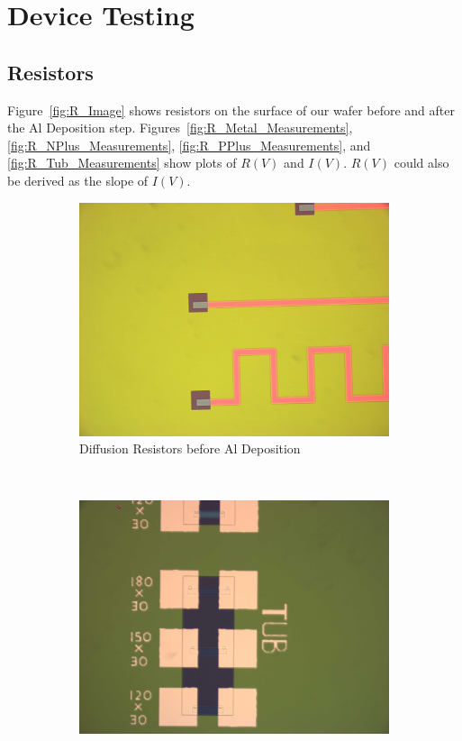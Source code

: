 \documentclass[letter,12pt]{article}
\begin{document}
\clearpage
\FloatBarrier
\section{Device Testing}
	\subsection{Resistors}
		Figure~\ref{fig:R_Image} shows resistors on the surface of our wafer before and after the Al Deposition step.  Figures~\ref{fig:R_Metal_Measurements}, \ref{fig:R_NPlus_Measurements}, \ref{fig:R_PPlus_Measurements}, and \ref{fig:R_Tub_Measurements} show plots of $R(V)$ and $I(V)$. $R(V)$ could also be derived as the slope of $I(V)$. 
	
		\begin{figure}[h!]
			\centering
			\begin{subfigure}[b]{.45\textwidth}
				\includegraphics[width=\textwidth]{./Images/5_Nov_Resistors.jpg}
				\caption{Diffusion Resistors before Al Deposition}
			\end{subfigure}
			~
			\begin{subfigure}[b]{.45\textwidth}
				\includegraphics[width=\textwidth]{./Images/19_Nov_Resistors.jpg}

\end{subfigure}
\end{figure}
\end{document}
